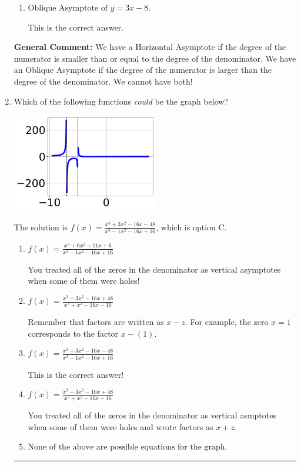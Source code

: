 \documentclass{extbook}[14pt]
\newcommand{\litem}[1]{\item #1

\rule{\textwidth}{0.4pt}}
\begin{document}
\begin{enumerate}
{\begin{enumerate}[label=\Alph*.]
This corresponds to believing there can be both a horizontal and oblique asymptote AND mixing up horizontal/vertical asymoptote.
\item \( \text{Oblique Asymptote of } y = 3x -8. \)

This is the correct answer.
\end{enumerate}

\textbf{General Comment:} We have a Horizontal Asymptote if the degree of the numerator is smaller than or equal to the degree of the denominator. We have an Oblique Asymptote if the degree of the numerator is larger than the degree of the denominator. We cannot have both!
}
\litem{
Which of the following functions \textit{could} be the graph below?

\begin{center}
    \includegraphics[width=0.5\textwidth]{../Figures/identifyGraphOfRationalFunctionCopyA.png}
\end{center}


The solution is \( f(x)=\frac{x^{3} +3 x^{2} -16 x -48}{x^{3} -1 x^{2} -16 x + 16} \), which is option C.\begin{enumerate}[label=\Alph*.]
\item \( f(x)=\frac{x^{3} +6 x^{2} +11 x + 6}{x^{3} -1 x^{2} -16 x + 16} \)

You treated all of the zeros in the denominator as vertical asymptotes when some of them were holes!
\item \( f(x)=\frac{x^{3} -3 x^{2} -16 x + 48}{x^{3} + x^{2} -16 x -16} \)

Remember that factors are written as $x-z$. For example, the zero $x=1$ corresponds to the factor $x-(1)$.
\item \( f(x)=\frac{x^{3} +3 x^{2} -16 x -48}{x^{3} -1 x^{2} -16 x + 16} \)

This is the correct answer!
\item \( f(x)=\frac{x^{3} -3 x^{2} -16 x + 48}{x^{3} + x^{2} -16 x -16} \)

You treated all of the zeros in the denominator as vertical asmptotes when some of them were holes and wrote factors as $x+z$.
\item \( \text{None of the above are possible equations for the graph.} \)


\end{enumerate}}
\end{enumerate}
\end{document}
